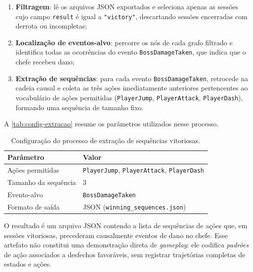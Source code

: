 \begin{enumerate}
    \item \textbf{Filtragem}: lê os arquivos JSON exportados e seleciona
          apenas as sessões cujo campo \texttt{result} é igual a
          \texttt{"victory"}, descartando sessões encerradas com derrota ou
          incompletas;
    \item \textbf{Localização de eventos-alvo}: percorre os nós de cada
          grafo filtrado e identifica todas as ocorrências do evento
          \texttt{BossDamageTaken}, que indica que o chefe recebeu dano;
    \item \textbf{Extração de sequências}: para cada evento
          \texttt{BossDamageTaken}, retrocede na cadeia causal e coleta as
          três ações imediatamente anteriores pertencentes ao vocabulário de
          ações permitidas (\texttt{PlayerJump}, \texttt{PlayerAttack},
          \texttt{PlayerDash}), formando uma sequência de tamanho fixo.
\end{enumerate}

A \autoref{tab:config-extracao} resume os parâmetros utilizados nesse
processo.

\begin{table}[htb]
    \centering
    \caption{Configuração do processo de extração de sequências vitoriosas.}
    \label{tab:config-extracao}
    \begin{tabular}{l l}
        \toprule
        \textbf{Parâmetro}    & \textbf{Valor}                                  \\
        \midrule
        Ações permitidas      & \texttt{PlayerJump}, \texttt{PlayerAttack},
                                \texttt{PlayerDash}                              \\
        Tamanho da sequência  & 3                                                \\
        Evento-alvo           & \texttt{BossDamageTaken}                         \\
        Formato de saída      & JSON (\texttt{winning\_sequences.json})          \\
        \bottomrule
    \end{tabular}
\end{table}

O resultado é um arquivo JSON contendo a lista de sequências de ações que, em
sessões vitoriosas, precederam causalmente eventos de dano no chefe. Esse
artefato não constitui uma demonstração direta de \textit{gameplay}: ele
codifica \textit{padrões} de ação associados a desfechos favoráveis, sem
registrar trajetórias completas de estados e ações.

